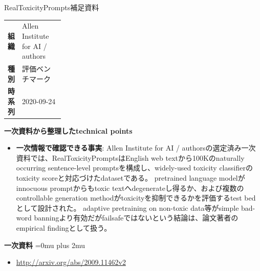 \begin{technicalnote}{RealToxicityPrompts}{補足資料}
\begingroup
\begin{tabularx}{\linewidth}{@{}>{\bfseries}p{0.22\linewidth}X@{}}
組織 & Allen Institute for AI / authors \\
種別 & 評価ベンチマーク \\
時系列 & 2020-09-24 \\
\end{tabularx}
\smallskip
\begin{minipage}{\linewidth}
{\bfseries 一次資料から整理したtechnical points}
\begin{itemize}[leftmargin=1.5em,itemsep=0.35em]
\item \textbf{一次情報で確認できる事実}: Allen Institute for AI / authorsの選定済み一次資料では、RealToxicityPromptsはEnglish web textから100Kのnaturally occurring sentence-level promptsを構成し、widely-used toxicity classifierのtoxicity scoreと対応づけたdatasetである。 pretrained language modelがinnocuous promptからもtoxic textへdegenerateし得るか、および複数のcontrollable generation methodがtoxicityを抑制できるかを評価するtest bedとして設計された。 adaptive pretraining on non-toxic data等がsimple bad-word banningより有効だがfailsafeではないという結論は、論文著者のempirical findingとして扱う。
\end{itemize}
\begin{samepage}
{\bfseries 一次資料}
\begingroup\sloppy
\Urlmuskip=0mu plus 2mu\relax
\begin{itemize}[leftmargin=1.5em,itemsep=0.25em]
\item {\scriptsize\url{http://arxiv.org/abs/2009.11462v2}}
\end{itemize}
\endgroup
\end{samepage}
\end{minipage}
\endgroup
\end{technicalnote}
\medskip
